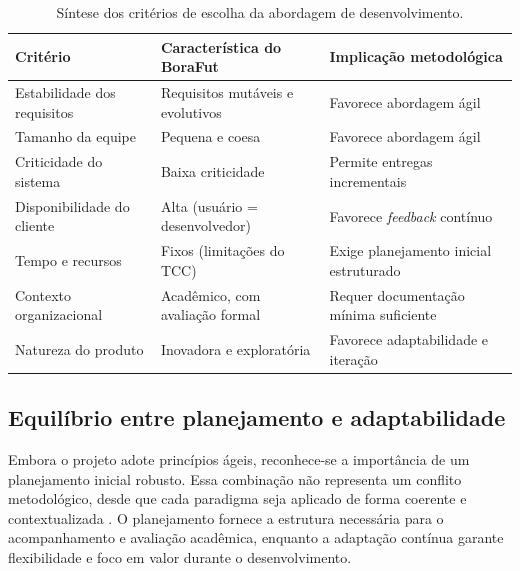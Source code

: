         \begin{table}[h]
        \centering
        \caption{Síntese dos critérios de escolha da abordagem de desenvolvimento.}
        \label{tab:criterios-abordagem}
        \begin{tabular}{p{4cm} p{5cm} p{5cm}}
        \toprule
        \textbf{Critério} & \textbf{Característica do BoraFut} & \textbf{Implicação metodológica} \\
        \midrule
        Estabilidade dos requisitos & Requisitos mutáveis e evolutivos & Favorece abordagem ágil \\
        Tamanho da equipe & Pequena e coesa & Favorece abordagem ágil \\
        Criticidade do sistema & Baixa criticidade & Permite entregas incrementais \\
        Disponibilidade do cliente & Alta (usuário = desenvolvedor) & Favorece \textit{feedback} contínuo \\
        Tempo e recursos & Fixos (limitações do TCC) & Exige planejamento inicial estruturado \\
        Contexto organizacional & Acadêmico, com avaliação formal & Requer documentação mínima suficiente \\
        Natureza do produto & Inovadora e exploratória & Favorece adaptabilidade e iteração \\
        \bottomrule
        \end{tabular}
        \end{table}

    \subsection{Equilíbrio entre planejamento e adaptabilidade}

        Embora o projeto adote princípios ágeis, reconhece-se a importância de um planejamento inicial robusto. Essa combinação não representa um conflito metodológico, desde que cada paradigma seja aplicado de forma coerente e contextualizada \cite{boehm2003}. O planejamento fornece a estrutura necessária para o acompanhamento e avaliação acadêmica, enquanto a adaptação contínua garante flexibilidade e foco em valor durante o desenvolvimento.

